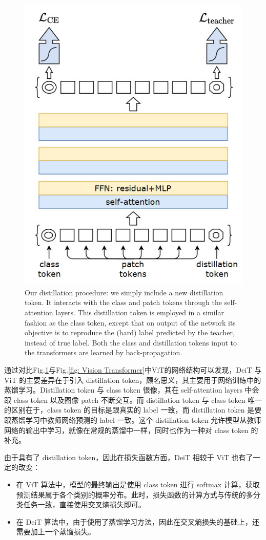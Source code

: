 \documentclass[letterpaper,10pt]{article}
\begin{document}
	\begin{figure}[htbp]
		\centering 
		\includegraphics[width=0.5
		\columnwidth]{picture/DeiT-network-structure}
		\caption{
			\label{fig: DeiT-network-structure} Our distillation procedure: we simply include a new distillation token. It interacts with the class and patch tokens through the self-attention layers. This distillation token is employed in a similar fashion as the class token, except that on output of the network its objective is to reproduce the (hard) label predicted by the teacher, instead of true label. Both the class and distillation tokens input to the transformers are learned by back-propagation.
		}
	\end{figure}
	
	通过对比Fig.\ref{fig: DeiT-network-structure}与Fig.\ref{fig: Vision Transformer}中ViT的网络结构可以发现，DeiT 与 ViT 的主要差异在于引入 distillation token，顾名思义，其主要用于网络训练中的蒸馏学习。Distillation token 与 class token 很像，其在 self-attention layers 中会跟 class token 以及图像 patch 不断交互。而 distillation token 与 class token 唯一的区别在于，class token 的目标是跟真实的 label 一致，而 distillation token 是要跟蒸馏学习中教师网络预测的 label 一致。这个 distillation token 允许模型从教师网络的输出中学习，就像在常规的蒸馏中一样，同时也作为一种对 class token 的补充。
	
	由于具有了 distillation token，因此在损失函数方面，DeiT 相较于 ViT 也有了一定的改变：
	
	\begin{itemize}
		\item{}
			在 ViT 算法中，模型的最终输出是使用 class token 进行 softmax 计算，获取预测结果属于各个类别的概率分布。此时，损失函数的计算方式与传统的多分类任务一致，直接使用交叉熵损失即可。
		\item{}
			在 DeiT 算法中，由于使用了蒸馏学习方法，因此在交叉熵损失的基础上，还需要加上一个蒸馏损失。
	\end{itemize}
	
\end{document}
